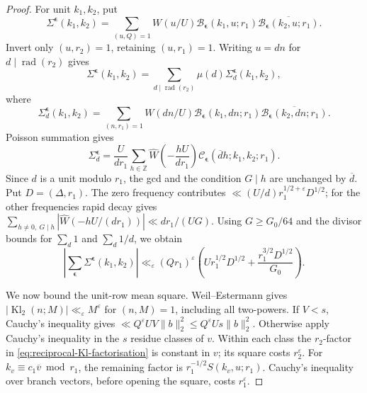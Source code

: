 \documentclass[12pt, a4paper]{amsart}
\numberwithin{equation}{section}
\newcommand{\ep}{\varepsilon}
\newcommand{\Z}{\mathbb{Z}}
\renewcommand{\bar}[1]{\overline{#1}}
\renewcommand{\le}{\leqslant}
\renewcommand{\ge}{\geqslant}
\theoremstyle{plain}
\begin{document}
\begin{proof}
For unit $k_1,k_2$, put
$$
 \Sigma^{\boldsymbol\epsilon}(k_1,k_2)
 =\sum_{(u,Q)=1}W(u/U)
  \mathcal B_{\boldsymbol\epsilon}(k_1,u;r_1)
  \overline{\mathcal B_{\boldsymbol\epsilon}(k_2,u;r_1)}.
$$
Invert only $(u,r_2)=1$, retaining $(u,r_1)=1$. Writing $u=dn$ for $d\mid\operatorname{rad}(r_2)$ gives
$$
\Sigma^{\boldsymbol\epsilon}(k_1,k_2)=\sum_{d\mid\operatorname{rad}(r_2)}\mu(d)\Sigma_d^{\boldsymbol\epsilon}(k_1,k_2),
$$
where
$$
\Sigma_d^{\boldsymbol\epsilon}(k_1,k_2)
=\sum_{(n,r_1)=1}W(dn/U)
\mathcal B_{\boldsymbol\epsilon}(k_1,dn;r_1)
\overline{\mathcal B_{\boldsymbol\epsilon}(k_2,dn;r_1)}.
$$
Poisson summation gives
\begin{equation}\label{eq:reciprocal-poisson-completion}
 \Sigma_d^{\boldsymbol\epsilon}
 =\frac{U}{dr_1}\sum_{h\in\Z}
  \widehat W\left(-\frac{hU}{dr_1}\right)
 \mathcal C_{\boldsymbol\epsilon}(\bar d h;k_1,k_2;r_1).
\end{equation}
Since $d$ is a unit modulo $r_1$, the gcd and the condition $G\mid h$ are unchanged by $\bar d$. Put $D=(\Delta,r_1)$. The zero frequency contributes $\ll(U/d)r_1^{1/2+\ep}D^{1/2}$; for the other frequencies rapid decay gives $\sum_{h\ne0,\ G\mid h}|\widehat W(-hU/(dr_1))|\ll dr_1/(UG)$. Using $G\ge G_0/64$ and the divisor bounds for $\sum_d1$ and $\sum_d1/d$, we obtain
\begin{equation}\label{eq:reciprocal-completed-correlation}
 \left|\sum_{\boldsymbol\epsilon}
  \Sigma^{\boldsymbol\epsilon}(k_1,k_2)\right|
 \ll_\ep (Qr_1)^\ep
 \left(Ur_1^{1/2}D^{1/2}
       +\frac{r_1^{3/2}D^{1/2}}{G_0}\right).
\end{equation}

We now bound the unit-row mean square. Weil--Estermann gives $|\operatorname{Kl}_2(n;M)|\ll_\ep M^\ep$ for $(n,M)=1$, including all two-powers. If $V<s$, Cauchy's inequality gives $\ll Q^\ep UV\|b\|_2^2\le Q^\ep Us\|b\|_2^2$. Otherwise apply Cauchy's inequality in the $s$ residue classes of $v$. Within each class the $r_2$-factor in \eqref{eq:reciprocal-Kl-factorisation} is constant in $v$; its square costs $r_2^\ep$. For $k_v\equiv c_1\bar v\bmod {r_1}$, the remaining factor is $r_1^{-1/2}S(k_v,u;r_1)$. Cauchy's inequality over branch vectors, before opening the square, costs $r_1^\ep$.


\end{proof}
\end{document}
